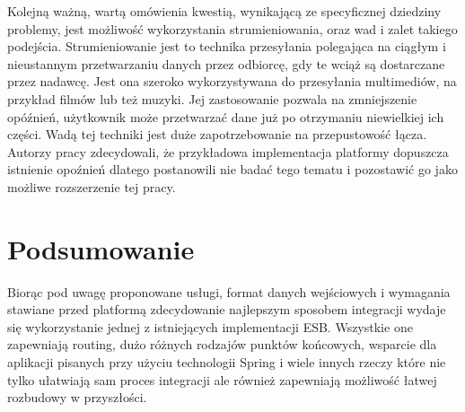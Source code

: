 Kolejną ważną, wartą omówienia kwestią, wynikającą ze specyficznej dziedziny problemy, jest możliwość wykorzystania strumieniowania, oraz wad i zalet takiego podejścia. Strumieniowanie jest to technika przesyłania polegająca na ciągłym i nieustannym przetwarzaniu danych przez odbiorcę, gdy te wciąż są dostarczane przez nadawcę. Jest ona szeroko wykorzystywana do przesyłania multimediów, na przykład filmów lub też muzyki. Jej zastosowanie pozwala na zmniejszenie opóźnień, użytkownik może przetwarzać dane już po otrzymaniu niewielkiej ich części. Wadą tej techniki jest duże zapotrzebowanie na przepustowość łącza. Autorzy pracy zdecydowali, że przykładowa implementacja platformy dopuszcza istnienie opoźnień dlatego postanowili nie badać tego tematu i pozostawić go jako możliwe rozszerzenie tej pracy. %

\section*{Podsumowanie}
Biorąc pod uwagę proponowane usługi, format danych wejściowych i wymagania stawiane przed platformą zdecydowanie najlepszym sposobem integracji wydaje się wykorzystanie jednej z istniejących implementacji ESB. Wszystkie one zapewniają routing, dużo różnych rodzajów punktów końcowych, wsparcie dla aplikacji pisanych przy użyciu technologii Spring i wiele innych rzeczy które nie tylko ułatwiają sam proces integracji ale również zapewniają możliwość łatwej rozbudowy w przyszłości.








